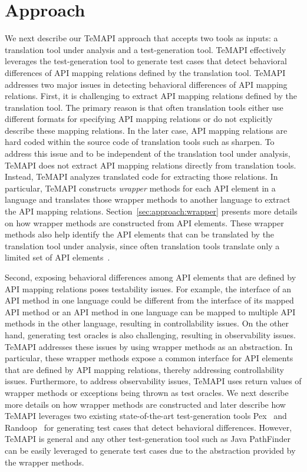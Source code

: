 \section{Approach}
\label{sec:approach}

We next describe our TeMAPI approach that accepts two tools as inputs: a translation tool under analysis and a test-generation tool. TeMAPI effectively leverages the test-generation tool to generate test cases that detect behavioral differences of API mapping relations defined by the translation tool. TeMAPI addresses two major issues in detecting behavioral differences of API mapping relations. First, it is challenging to extract API mapping relations defined by the translation tool. The primary reason is that often translation tools either use different formats for specifying API mapping relations or do not explicitly describe these mapping relations. In the later case, API mapping relations are hard coded within the source code of translation tools such as sharpen. To address this issue and to be independent of the translation tool under analysis, TeMAPI does not extract API mapping relations directly from translation tools. Instead, TeMAPI analyzes translated code for extracting those relations. In particular, TeMAPI constructs \emph{wrapper} methods for each API element in a language and translates those wrapper methods to another language to extract the API mapping relations. Section~\ref{sec:approach:wrapper} presents more details on how wrapper methods are constructed from API elements. These wrapper methods also help identify the API elements that can be translated by the translation tool under analysis, since often translation tools translate only a limited set of API elements~\cite{zhong2010mining}.

Second, exposing behavioral differences among API elements that are defined by API mapping relations poses testability issues. For example, the interface of an API method in one language could be different from the interface of its mapped API method or an API method in one language can be mapped to multiple API methods in the other language, resulting in controllability issues. On the other hand, generating test oracles is also challenging, resulting in observability issues. TeMAPI addresses these issues by using wrapper methods as an abstraction. In particular, these wrapper methods expose a common interface for API elements that are defined by API mapping relations, thereby addressing controllability issues. Furthermore, to address observability issues, TeMAPI uses return values of wrapper methods or exceptions being thrown as test oracles. We next describe more details on how wrapper methods are constructed and later describe how TeMAPI leverages two existing state-of-the-art test-generation tools Pex~\cite{tillmann2008pex} and Randoop~\cite{pacheco2007feedback} for generating test cases that detect behavioral differences. However, TeMAPI is general and any other test-generation tool such as Java PathFinder~\cite{DBLP:conf/tacas/AnandPV07} can be easily leveraged to generate test cases due to the abstraction provided by the wrapper methods.

